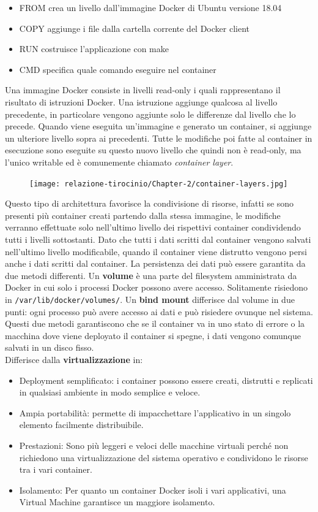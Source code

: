 \documentclass[a4paper,10pt]{memoir}
\begin{document}
\begin{itemize}
    \item FROM crea un livello dall'immagine Docker di Ubuntu versione 18.04
    \item COPY aggiunge i file dalla cartella corrente del Docker client
    \item RUN costruisce l'applicazione con make
    \item CMD specifica quale comando eseguire nel container
\end{itemize}
Una immagine Docker consiste in livelli read-only i quali rappresentano il risultato di istruzioni Docker. Una istruzione aggiunge qualcosa al livello precedente, in particolare vengono aggiunte solo le differenze dal livello che lo precede.
Quando viene eseguita un'immagine e generato un container, si aggiunge un ulteriore livello sopra ai precedenti.
Tutte le modifiche poi fatte al container in esecuzione sono eseguite su questo nuovo livello che quindi non è read-only, ma l'unico writable ed è comunemente chiamato \textit{container layer}.
\begin{figure}[ht]
\texttt{[image: relazione-tirocinio/Chapter-2/container-layers.jpg]}
\end{figure}
Questo tipo di architettura favorisce la condivisione di risorse, infatti se sono presenti più container creati partendo dalla stessa immagine, le modifiche verranno effettuate solo nell'ultimo livello dei rispettivi container condividendo tutti i livelli sottostanti\cite{aboutstoragedrivers}.
Dato che tutti i dati scritti dal container vengono salvati nell'ultimo livello modificabile, quando il container viene distrutto vengono persi anche i dati scritti dal container.
La persistenza dei dati può essere garantita da due metodi differenti.
Un \textbf{volume} è una parte del filesystem amministrata da Docker in cui solo i processi Docker possono avere accesso. Solitamente risiedono in \texttt{/var/lib/docker/volumes/}.
Un \textbf{bind mount} differisce dal volume in due punti: ogni processo può avere accesso ai dati e può risiedere ovunque nel sistema. 
Questi due metodi garantiscono che se il container va in uno stato di errore o la macchina dove viene deployato il container si spegne, i dati vengono comunque salvati in un disco fisso.
\\
Differisce dalla \textbf{virtualizzazione} \cite{dockervsvm2} in:

\begin{itemize}
    \item Deployment semplificato: i container possono essere creati, distrutti e replicati in qualsiasi ambiente in modo semplice e veloce.
    \item Ampia portabilità: permette di impacchettare l'applicativo in un singolo elemento facilmente distribuibile.
    \item Prestazioni: Sono più leggeri e veloci delle macchine virtuali perché non richiedono una virtualizzazione del sistema operativo e condividono le risorse tra i vari container.
    \item Isolamento: Per quanto un container Docker isoli i vari applicativi, una Virtual Machine garantisce un maggiore isolamento.
\end{itemize}
\end{document}
